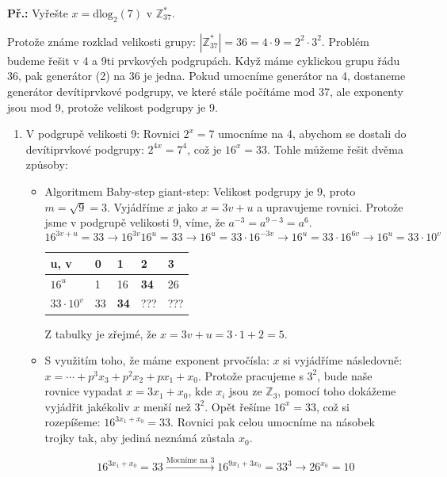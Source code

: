 \begin{exercise}
\textbf{Př.:} Vyřešte $x = \text{dlog}_2 (7)$ v $\mathbb{Z}_{37}^*$.

Protože známe rozklad velikosti grupy: $|\mathbb{Z}_{37}^*| = 36 = 4 \cdot 9 =
2^2 \cdot 3^2$. Problém budeme řešit v 4 a 9ti prvkových podgrupách. Když máme
cyklickou grupu řádu 36, pak generátor (2) na 36 je jedna. Pokud umocníme
generátor na 4, dostaneme generátor devítiprvkové podgrupy, ve které stále
počítáme mod 37, ale exponenty jsou mod 9, protože velikost podgrupy je 9.

\begin{enumerate}
\item V podgrupě velikosti 9: Rovnici $2^x = 7$ umocníme na 4, abychom se
dostali do devítiprvkové podgrupy: $2^{4x} = 7^4$, což je $16^x = 33$. Tohle
můžeme řešit dvěma způsoby:
\begin{itemize}
\item Algoritmem Baby-step giant-step: Velikost podgrupy je 9, proto $m =
\sqrt{9} = 3$. Vyjádříme $x$ jako $x = 3v + u$ a upravujeme rovnici. Protože
jsme v podgrupě velikosti 9, víme, že $a^{-3} = a^{9-3} = a^6$.
$$16^{3v+u} = 33 \xrightarrow{}16^{3v}16^u = 33 \xrightarrow{}16^u = 33\cdot
16^{-3v} \xrightarrow{} 16^u = 33\cdot 16^{6v} \xrightarrow{}16^u = 33\cdot
10^v$$

\begin{center}
\begin{tabular}{|p{1cm}|p{1cm}|p{1cm}|p{1cm}|p{1cm}|}
\hline
u, v & 0 & 1 & 2 & 3\\
\hline
\hline
$16^u$ & 1 & 16 & \textbf{34} & 26\\
\hline
$33\cdot 10^v$ & 33 & \textbf{34} & ??? & ??? \\
\hline
\end{tabular}
\end{center}

Z tabulky je zřejmé, že $x = 3v + u = 3\cdot 1 + 2 = 5$.

\item S využitím toho, že máme exponent prvočísla: $x$ si vyjádříme následovně:
$x = \cdots + p^3x_3 + p^2x_2 + px_1 + x_0$. Protože pracujeme s $3^2$, bude
naše rovnice vypadat $x = 3x_1 + x_0$, kde $x_i$ jsou ze $\mathbb{Z}_{3}$,
pomocí toho dokážeme vyjádřit jakékoliv $x$ menší než $3^2$. Opět řešíme $16^x =
33$, což si rozepíšeme:  $16^{3x_1 + x_0} = 33$. Rovnici pak celou umocníme na
násobek trojky tak, aby jediná neznámá zůstala $x_0$. 

$$ 16^{3x_1 + x_0} = 33  \xrightarrow{\text{Mocníme na 3}} 16^{9x_1 + 3x_0} =
33^3 \xrightarrow{} 26^{x_0} = 10$$


\end{itemize}
\end{enumerate}
\end{exercise}
